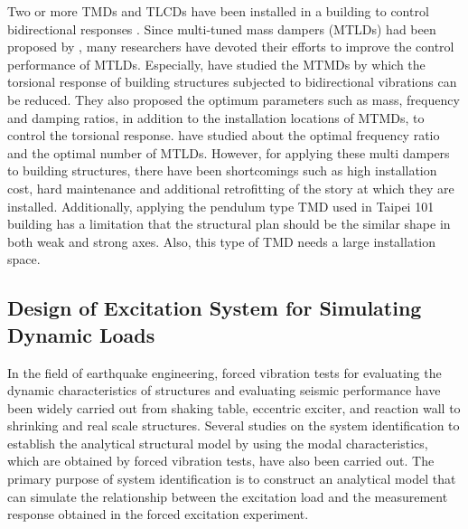 Two or more TMDs and TLCDs have been installed in a building to control bidirectional responses\citep{xu1992dynamic, fujino1993vibration, yamaguchi1993fundamental, igusa1994vibration, jangid1997performance, li2000performance, li2000optimum, singh2002tuned} . Since multi-tuned mass dampers (MTLDs) had been proposed by \citet{xu1992dynamic,igusa1994vibration}, many researchers have devoted their efforts to improve the control performance of MTLDs\citep{fujino1993vibration, yamaguchi1993fundamental, jangid1997performance, li2000performance, li2000optimum, singh2002tuned, zhang2004equivalent}. Especially, \citet{jangid1997performance, singh2002tuned} have studied the MTMDs by which the torsional response of building structures subjected to bidirectional vibrations can be reduced. They also proposed the optimum parameters such as mass, frequency and damping ratios, in addition to the installation locations of MTMDs, to control the torsional response. \citet{fujino1993vibration} have studied about the optimal frequency ratio and the optimal number of MTLDs. However, for applying these multi dampers to building structures, there have been shortcomings such as high installation cost, hard maintenance and additional retrofitting of the story at which they are installed. Additionally, applying the pendulum type TMD used in Taipei 101 building has a limitation that the structural plan should be the similar shape in both weak and strong axes. Also, this type of TMD needs a large installation space\citep{haskett2004tuned}.

\subsection{Design of Excitation System for Simulating Dynamic Loads}

In the field of earthquake engineering, forced vibration tests for evaluating the dynamic characteristics of structures and evaluating seismic performance have been widely carried out from shaking table, eccentric exciter, and reaction wall to shrinking and real scale structures.
Several studies on the system identification to establish the analytical structural model by using the modal characteristics, which are obtained by forced vibration tests, have also been carried out\citep{halling2001dynamic,min2004vibration}.
The primary purpose of system identification is to construct an analytical model that can simulate the relationship between the excitation load and the measurement response obtained in the forced excitation experiment.

